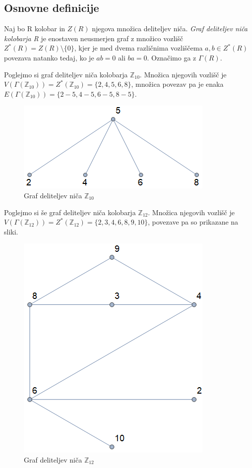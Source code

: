 \documentclass[mat1, tisk]{fmfdelo}
\newcommand{\Z}{\mathbb Z}
\begin{document}
\subsection{Osnovne definicije}
%
\begin{definicija}
  Naj bo R kolobar in $Z(R)$ njegova množica deliteljev niča.
  \emph{Graf deliteljev niča kolobarja R} je enostaven neusmerjen graf z množico
  vozlišč $Z^{*}(R) = Z(R)\setminus\{0\} $, kjer je med dvema različnima vozliščema $a,b \in Z^{*}(R) $
  povezava natanko tedaj, ko je $ab = 0$ ali $ba = 0$. Označimo ga z $\Gamma(R)$.
\end{definicija}
%
\begin{zgled}\label{prim1}
  Poglejmo si graf deliteljev niča kolobarja $\Z_{10}$. Množica njegovih vozlišč je 
  $V(\Gamma(\Z_{10})) = Z^{*}(\Z_{10}) = \{2, 4, 5, 6, 8\}$, množica povezav pa 
  je enaka $E(\Gamma(\Z_{10})) = \{2 - 5, 4 - 5, 6 - 5, 8 - 5\}$.
  \begin{figure}[H]
    \centering
    \includegraphics[scale=0.5]{z10.png}
    \caption{Graf deliteljev niča $\Z_{10}$}
  \end{figure}
\end{zgled}
%
\begin{zgled}\label{zgled2.3}
  Poglejmo si še graf deliteljev niča kolobarja $\Z_{12}$. Množica njegovih vozlišč je 
  $V(\Gamma(\Z_{12})) = Z^{*}(\Z_{12}) = \{2, 3, 4, 6, 8, 9, 10\}$, povezave pa so 
  prikazane na sliki.
  \begin{figure}[H]
    \centering
    \includegraphics[scale=0.5]{z12.png}
    \caption{Graf deliteljev niča $\Z_{12}$}
  \end{figure}
\end{zgled}
\end{document}
